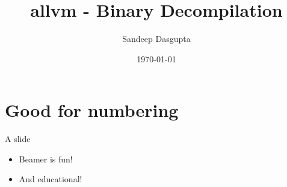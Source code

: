 \documentclass[xcolor=dvipsnames]{beamer}
\title[YTH!]{allvm - Binary Decompilation}
\author{Sandeep Dasgupta}
\institute[UIUC]{University of Illinois Urbana Champaign}
\date{\today}
\begin{document}
{\nologo
\begin{frame}
\titlepage
\end{frame}
}


\section*{Good for numbering}

\begin{frame}{A slide}

\begin{itemize}
	\item Beamer is fun!
	\item And educational!
\end{itemize}

\end{frame}
\end{document}
